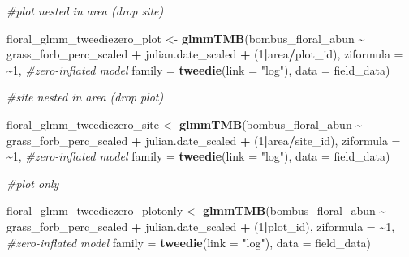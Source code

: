 \documentclass[
]{article}
\newenvironment{Shaded}{\begin{snugshade}}{\end{snugshade}}
\newcommand{\AttributeTok}[1]{\textcolor[rgb]{0.13,0.29,0.53}{#1}}
\newcommand{\CommentTok}[1]{\textcolor[rgb]{0.56,0.35,0.01}{\textit{#1}}}
\newcommand{\DecValTok}[1]{\textcolor[rgb]{0.00,0.00,0.81}{#1}}
\newcommand{\FunctionTok}[1]{\textcolor[rgb]{0.13,0.29,0.53}{\textbf{#1}}}
\newcommand{\NormalTok}[1]{#1}
\newcommand{\OtherTok}[1]{\textcolor[rgb]{0.56,0.35,0.01}{#1}}
\newcommand{\SpecialCharTok}[1]{\textcolor[rgb]{0.81,0.36,0.00}{\textbf{#1}}}
\newcommand{\StringTok}[1]{\textcolor[rgb]{0.31,0.60,0.02}{#1}}
\begin{document}
\begin{Shaded}
\begin{Highlighting}[]
\CommentTok{\#plot nested in area (drop site)}

\NormalTok{floral\_glmm\_tweediezero\_plot }\OtherTok{\textless{}{-}} \FunctionTok{glmmTMB}\NormalTok{(bombus\_floral\_abun }\SpecialCharTok{\textasciitilde{}}\NormalTok{ grass\_forb\_perc\_scaled }\SpecialCharTok{+} 
\NormalTok{                    julian.date\_scaled }\SpecialCharTok{+}\NormalTok{ (}\DecValTok{1}\SpecialCharTok{|}\NormalTok{area}\SpecialCharTok{/}\NormalTok{plot\_id), }
                    \AttributeTok{ziformula =} \SpecialCharTok{\textasciitilde{}}\DecValTok{1}\NormalTok{, }\CommentTok{\#zero{-}inflated model}
                  \AttributeTok{family =} \FunctionTok{tweedie}\NormalTok{(}\AttributeTok{link =} \StringTok{"log"}\NormalTok{), }
                  \AttributeTok{data =}\NormalTok{ field\_data)}

\CommentTok{\#site nested in area (drop plot)}

\NormalTok{floral\_glmm\_tweediezero\_site }\OtherTok{\textless{}{-}} \FunctionTok{glmmTMB}\NormalTok{(bombus\_floral\_abun }\SpecialCharTok{\textasciitilde{}}\NormalTok{ grass\_forb\_perc\_scaled }\SpecialCharTok{+} 
\NormalTok{                    julian.date\_scaled }\SpecialCharTok{+}\NormalTok{ (}\DecValTok{1}\SpecialCharTok{|}\NormalTok{area}\SpecialCharTok{/}\NormalTok{site\_id), }
                    \AttributeTok{ziformula =} \SpecialCharTok{\textasciitilde{}}\DecValTok{1}\NormalTok{, }\CommentTok{\#zero{-}inflated model}
                  \AttributeTok{family =} \FunctionTok{tweedie}\NormalTok{(}\AttributeTok{link =} \StringTok{"log"}\NormalTok{), }
                  \AttributeTok{data =}\NormalTok{ field\_data)}

\CommentTok{\#plot only}

\NormalTok{floral\_glmm\_tweediezero\_plotonly }\OtherTok{\textless{}{-}} \FunctionTok{glmmTMB}\NormalTok{(bombus\_floral\_abun }\SpecialCharTok{\textasciitilde{}}\NormalTok{ grass\_forb\_perc\_scaled }\SpecialCharTok{+} 
\NormalTok{                    julian.date\_scaled }\SpecialCharTok{+}\NormalTok{ (}\DecValTok{1}\SpecialCharTok{|}\NormalTok{plot\_id), }
                    \AttributeTok{ziformula =} \SpecialCharTok{\textasciitilde{}}\DecValTok{1}\NormalTok{, }\CommentTok{\#zero{-}inflated model}
                  \AttributeTok{family =} \FunctionTok{tweedie}\NormalTok{(}\AttributeTok{link =} \StringTok{"log"}\NormalTok{), }
                  \AttributeTok{data =}\NormalTok{ field\_data)}


\end{Highlighting}
\end{Shaded}
\end{document}
